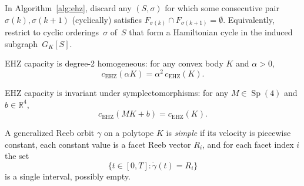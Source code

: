 \begin{corollary}\label{cor:adjacency-pruning}
In Algorithm~\ref{alg:ehz}, discard any
$(S, \sigma)$ for which some consecutive pair
$\sigma(k), \sigma(k{+}1)$ (cyclically) satisfies
$F_{\sigma(k)} \cap F_{\sigma(k+1)} = \emptyset$.
Equivalently, restrict to cyclic orderings~$\sigma$ of~$S$ that
form a Hamiltonian cycle in the induced subgraph~$G_K[S]$.
\end{corollary}


\begin{unverified}
\begin{theorem}[Conformality]\label{thm:conformality}
EHZ capacity is degree-2 homogeneous: for any convex body $K$
and $\alpha > 0$,
\[
  c_{\mathrm{EHZ}}(\alpha K) = \alpha^2\, c_{\mathrm{EHZ}}(K).
\]
\end{theorem}
\end{unverified}


\begin{unverified}
\begin{theorem}\label{thm:sympl-invariance}
EHZ capacity is invariant under symplectomorphisms: for any
$M \in \operatorname{Sp}(4)$ and $b \in \mathbb{R}^4$,
\[
  c_{\mathrm{EHZ}}(MK + b) = c_{\mathrm{EHZ}}(K).
\]
\end{theorem}
\end{unverified}



\begin{definition}\label{def:simple-reeb-orbit}
A generalized Reeb orbit $\gamma$ on a polytope $K$ is \emph{simple} if
its velocity is piecewise constant, each constant value is a facet Reeb
vector $R_i$, and for each facet index $i$ the set
\[
  \{ t \in [0,T] : \dot{\gamma}(t) = R_i \}
\]
is a single interval, possibly empty.
\end{definition}

